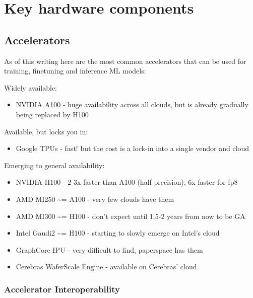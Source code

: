 \documentclass[
]{report}
\providecommand{\tightlist}{%
  \setlength{\itemsep}{0pt}\setlength{\parskip}{0pt}}\usepackage{longtable,booktabs,array}
\begin{document}
\section{Key hardware components}\label{key-hardware-components}

\subsection{Accelerators}\label{accelerators}

As of this writing here are the most common accelerators that can be
used for training, finetuning and inference ML models:

Widely available:

\begin{itemize}
\tightlist
\item
  NVIDIA A100 - huge availability across all clouds, but is already
  gradually being replaced by H100
\end{itemize}

Available, but locks you in:

\begin{itemize}
\tightlist
\item
  Google TPUs - fast! but the cost is a lock-in into a single vendor and
  cloud
\end{itemize}

Emerging to general availability:

\begin{itemize}
\item
  NVIDIA H100 - 2-3x faster than A100 (half precision), 6x faster for
  fp8
\item
  AMD MI250 \textasciitilde= A100 - very few clouds have them
\item
  AMD MI300 \textasciitilde= H100 - don't expect until 1.5-2 years from
  now to be GA
\item
  Intel Gaudi2 \textasciitilde= H100 - starting to slowly emerge on
  Intel's cloud
\item
  GraphCore IPU - very difficult to find, paperspace has them
\item
  Cerebras WaferScale Engine - available on Cerebras' cloud
\end{itemize}

\subsubsection{Accelerator
Interoperability}\label{accelerator-interoperability}
\end{document}
